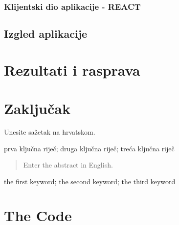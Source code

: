 \documentclass[zavrsnirad]{fer}
\begin{document}
\subsection{Klijentski dio aplikacije - REACT}
\label{sec:frontend}

\section{Izgled aplikacije}


\chapter{Rezultati i rasprava}
\label{pog:rezultati_i_rasprava}


\chapter{Zaključak}
\label{pog:zakljucak}




\nocite{*}




\begin{sazetak}
  Unesite sažetak na hrvatskom.

  \blindtext
\end{sazetak}

\begin{kljucnerijeci}
  prva ključna riječ; druga ključna riječ; treća ključna riječ
\end{kljucnerijeci}


\begin{abstract}
  Enter the abstract in English.
  
  \blindtext 
\end{abstract}

\begin{keywords}
  the first keyword; the second keyword; the third keyword
\end{keywords}



\backmatter

\chapter{The Code}
\end{document}
